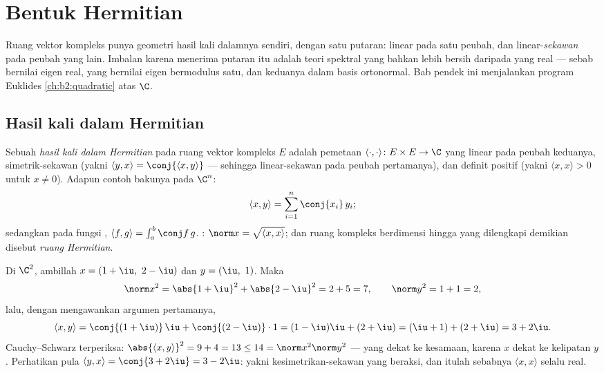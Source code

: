 \chapter{Bentuk Hermitian}\label{ch:b2:hermitian}

Ruang vektor kompleks punya geometri hasil kali dalamnya sendiri, dengan
satu putaran: linear pada satu peubah, dan linear-\emph{sekawan} pada
peubah yang lain. Imbalan karena menerima putaran itu adalah teori spektral
yang bahkan lebih bersih daripada yang real --- sebab 
bernilai eigen real, yang  bernilai eigen bermodulus satu, dan keduanya
 dalam basis ortonormal. Bab pendek ini menjalankan
program Euklides \cref{ch:b2:quadratic} atas $\C$.

\section{Hasil kali dalam Hermitian}

\begin{definition}\label{def:b2:hermitian:def}
Sebuah \emph{hasil kali dalam Hermitian}
pada ruang vektor kompleks $E$ adalah pemetaan $\langle\cdot,\cdot\rangle
\colon E \times E \to \C$ yang linear pada peubah keduanya,
simetrik-sekawan (yakni $\langle y, x\rangle = \conj{\langle x,
y\rangle}$ --- sehingga linear-sekawan pada peubah pertamanya), dan
definit positif (yakni $\langle x, x\rangle > 0$ untuk $x \neq 0$). Adapun
contoh bakunya pada $\C^n$:
\[
\langle x, y \rangle = \sum_{i=1}^{n} \conj{x_i}\, y_i ;
\]
sedangkan pada fungsi , $\langle f, g\rangle = \int_a^b \conj
f\,g$. : $\norm x = \sqrt{\langle x,x\rangle}$; dan ruang
kompleks berdimensi hingga yang dilengkapi demikian disebut \emph{ruang
Hermitian}.
\end{definition}

\begin{example}\label{ex:b2:hermitian:firstcomp}
Di $\C^2$, ambillah $x = (1+\iu,\ 2-\iu)$ dan $y = (\iu,\ 1)$.
Maka
\[
\norm x^2 = \abs{1+\iu}^2 + \abs{2-\iu}^2 = 2 + 5 = 7,
\qquad
\norm y^2 = 1 + 1 = 2,
\]
lalu, dengan mengawankan argumen pertamanya,
\[
\langle x, y\rangle
= \conj{(1+\iu)}\,\iu + \conj{(2-\iu)}\cdot1
= (1-\iu)\iu + (2+\iu)
= (\iu + 1) + (2 + \iu) = 3 + 2\iu .
\]
Cauchy--Schwarz terperiksa: $\abs{\langle x, y\rangle}^2 = 9 +
4 = 13 \leq 14 = \norm x^2\norm y^2$ --- yang dekat ke kesamaan,
karena $x$ dekat ke kelipatan $y$. Perhatikan pula
$\langle y, x\rangle = \conj{3 + 2\iu} = 3 - 2\iu$: yakni
kesimetrikan-sekawan yang beraksi, dan itulah sebabnya $\langle x,
x\rangle$ selalu real.
\end{example}

